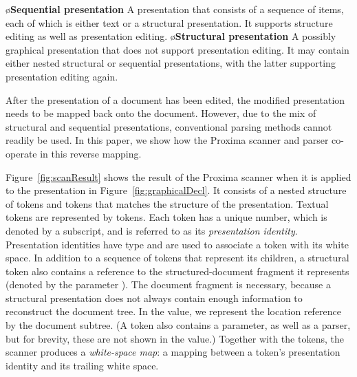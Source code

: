 \documentclass{article}[10pt]
\begin{document}
\bl
\o {\bf Sequential presentation} A presentation that consists of a sequence of items, each of which is either text or a structural presentation. It supports structure editing as well as presentation editing.
\o {\bf Structural presentation} A possibly graphical presentation that does not support presentation editing. It may contain either nested structural or sequential presentations, with the latter supporting presentation editing again.
\el


After the presentation of a document has been edited, the modified presentation needs to be mapped back onto the document. However, due to the mix of structural and sequential presentations, conventional parsing methods cannot readily be used. In this paper, we show how the Proxima scanner and parser co-operate in this reverse mapping. 

\enlargethispage{\baselineskip}

Figure~\ref{fig:scanResult} shows the result of the Proxima scanner when it is applied to the presentation in Figure~\ref{fig:graphicalDecl}. It consists of a nested structure of  tokens and  tokens that matches the structure of the presentation. Textual tokens are represented by  tokens. Each token has a unique number, which is denoted by a subscript, and is referred to as its {\em presentation identity}. Presentation identities have type  and are used to associate a token with its white space. In addition to a sequence of tokens that represent its children, a structural token also contains a reference to the structured-document fragment it represents (denoted by the parameter ). The document fragment is necessary, because a structural presentation does not always contain enough information to reconstruct the document tree. In the  value, we represent the location reference by the document subtree. (A  token also contains a  parameter, as well as a parser, but for brevity, these are not shown in the value.) Together with the tokens, the scanner produces a {\em white-space map}: a mapping between a token's presentation identity and its trailing white space.
\end{document}

